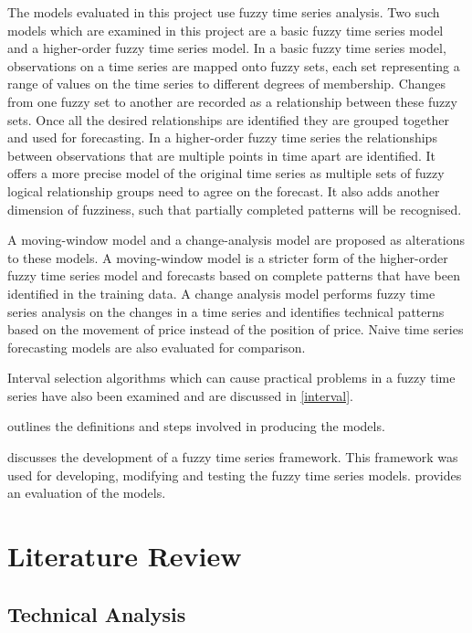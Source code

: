\documentclass[12pt, oneside, a4paper]{article}
\theoremstyle{definition}
\begin{document}
The models evaluated in this project use fuzzy time series analysis. Two such models which are examined in this project are a basic fuzzy time series model and a higher-order fuzzy time series model. In a basic fuzzy time series model, observations on a time series are mapped onto fuzzy sets, each set representing a range of values on the time series to different degrees of membership. Changes from one fuzzy set to another are recorded as a relationship between these fuzzy sets. Once all the desired relationships are identified they are grouped together and used for forecasting. In a higher-order fuzzy time series the relationships between observations that are multiple points in time apart are identified. It offers a more precise model of the original time series as multiple sets of fuzzy logical relationship groups need to agree on the forecast. It also adds another dimension of fuzziness, such that partially completed patterns will be recognised. 

A moving-window model and a change-analysis model are proposed as alterations to these models. A moving-window model is a stricter form of the higher-order fuzzy time series model and forecasts based on complete patterns that have been identified in the training data. A change analysis model performs fuzzy time series analysis on the changes in a time series and identifies technical patterns based on the movement of price instead of the position of price. Naive time series forecasting models are also evaluated for comparison. 

Interval selection algorithms which can cause practical problems in a fuzzy time series have also been examined and are discussed in \cref{interval}.

 outlines the definitions and steps involved in producing the models.

 discusses the development of a fuzzy time series framework. This framework was used for developing, modifying and testing the fuzzy time series models.  provides an evaluation of the models.

\section{Literature Review}

\subsection{Technical Analysis}
\label{ta}
\end{document}
